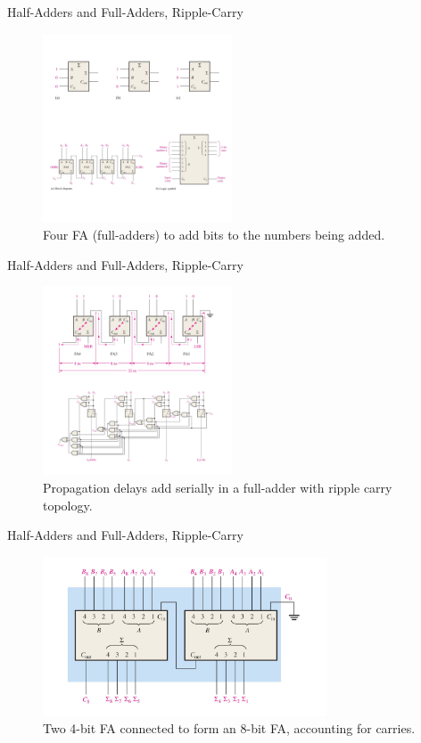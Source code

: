 \documentclass{beamer}
\begin{document}
\begin{frame}{Half-Adders and Full-Adders, Ripple-Carry}
\begin{figure}
\centering
\includegraphics[width=0.5\textwidth]{figures/adder8.pdf}
\caption{\label{fig:add8} Four FA (full-adders) to add bits to the numbers being added.}
\end{figure}
\end{frame}

\begin{frame}{Half-Adders and Full-Adders, Ripple-Carry}
\begin{figure}
\centering
\includegraphics[width=0.5\textwidth]{figures/adder9.pdf}
\caption{\label{fig:add9} Propagation delays add serially in a full-adder with ripple carry topology.}
\end{figure}
\end{frame}

\begin{frame}{Half-Adders and Full-Adders, Ripple-Carry}
\begin{figure}
\centering
\includegraphics[width=0.75\textwidth]{figures/adder10.pdf}
\caption{\label{fig:add10} Two 4-bit FA connected to form an 8-bit FA, accounting for carries.}
\end{figure}
\end{frame}
\end{document}
